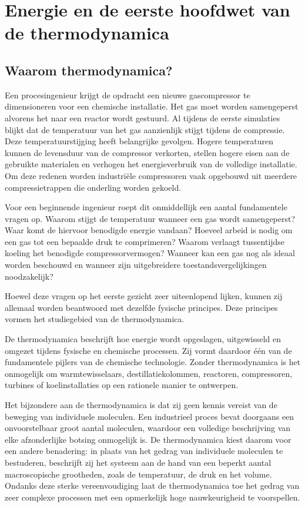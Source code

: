 \chapter{Energie en de eerste hoofdwet van de thermodynamica}
\label{ch:energie}

\section{Waarom thermodynamica?}

Een procesingenieur krijgt de opdracht een nieuwe gascompressor te dimensioneren voor een chemische installatie. Het gas moet worden samengeperst alvorens het naar een reactor wordt gestuurd. Al tijdens de eerste simulaties blijkt dat de temperatuur van het gas aanzienlijk stijgt tijdens de compressie. Deze temperatuurstijging heeft belangrijke gevolgen. Hogere temperaturen kunnen de levensduur van de compressor verkorten, stellen hogere eisen aan de gebruikte materialen en verhogen het energieverbruik van de volledige installatie. Om deze redenen worden industri\"ele compressoren vaak opgebouwd uit meerdere compressietrappen die onderling worden gekoeld.

Voor een beginnende ingenieur roept dit onmiddellijk een aantal fundamentele vragen op. Waarom stijgt de temperatuur wanneer een gas wordt samengeperst? Waar komt de hiervoor benodigde energie vandaan? Hoeveel arbeid is nodig om een gas tot een bepaalde druk te comprimeren? Waarom verlaagt tussentijdse koeling het benodigde compressorvermogen? Wanneer kan een gas nog als ideaal worden beschouwd en wanneer zijn uitgebreidere toestandsvergelijkingen noodzakelijk?

Hoewel deze vragen op het eerste gezicht zeer uiteenlopend lijken, kunnen zij allemaal worden beantwoord met dezelfde fysische principes. Deze principes vormen het studiegebied van de thermodynamica.

De thermodynamica beschrijft hoe energie wordt opgeslagen, uitgewisseld en omgezet tijdens fysische en chemische processen. Zij vormt daardoor \'e\'en van de fundamentele pijlers van de chemische technologie. Zonder thermodynamica is het onmogelijk om warmtewisselaars, destillatiekolommen, reactoren, compressoren, turbines of koelinstallaties op een rationele manier te ontwerpen.

Het bijzondere aan de thermodynamica is dat zij geen kennis vereist van de beweging van individuele moleculen. Een industrieel proces bevat doorgaans een onvoorstelbaar groot aantal moleculen, waardoor een volledige beschrijving van elke afzonderlijke botsing onmogelijk is. De thermodynamica kiest daarom voor een andere benadering: in plaats van het gedrag van individuele moleculen te bestuderen, beschrijft zij het systeem aan de hand van een beperkt aantal macroscopische grootheden, zoals de temperatuur, de druk en het volume. Ondanks deze sterke vereenvoudiging laat de thermodynamica toe het gedrag van zeer complexe processen met een opmerkelijk hoge nauwkeurigheid te voorspellen.

